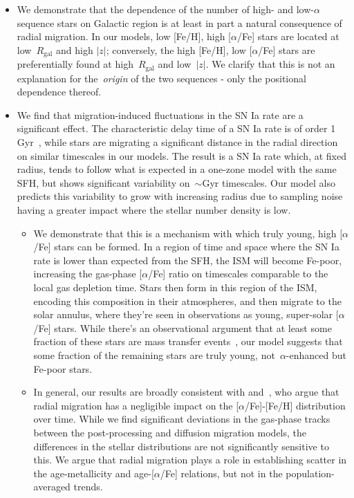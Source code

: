 \documentclass[fleqn, usenatbib]{mnras}
\begin{document}
\begin{itemize}
	\item We demonstrate that the dependence of the number of high- and 
	low-$\alpha$ sequence stars on Galactic region is at least in part a 
	natural consequence of radial migration. In our models, low [Fe/H], high 
	[$\alpha$/Fe] stars are located at low~$R_\text{gal}$ and high 
	$\left|z\right|$; conversely, the high [Fe/H], low [$\alpha$/Fe] stars are 
	preferentially found at high~$R_\text{gal}$ and low~$\left|z\right|$. We 
	clarify that this is not an explanation for the~\textit{origin} of the 
	two sequences - only the positional dependence thereof. 

	\item We find that migration-induced fluctuations in the SN Ia rate are a 
	significant effect. The characteristic delay time of a SN Ia rate is of 
	order 1 Gyr~\citep{Maoz2012, Maoz2017}, while stars are migrating a 
	significant distance in the radial direction on similar timescales in our 
	models. The result is a SN Ia rate which, at fixed radius, tends to follow 
	what is expected in a one-zone model with the same SFH, but shows 
	significant variability on~$\sim$Gyr timescales. Our model also predicts 
	this variability to grow with increasing radius due to sampling noise 
	having a greater impact where the stellar number density is low. 
	\begin{itemize} 
		\item We demonstrate that this is a mechanism with which truly young, 
		high [$\alpha$/Fe] stars can be formed. In a region of time and space 
		where the SN Ia rate is lower than expected from the SFH, the ISM will 
		become Fe-poor, increasing the gas-phase [$\alpha$/Fe] ratio on 
		timescales comparable to the local gas depletion time. Stars 
		then form in this region of the ISM, encoding this composition in their 
		atmospheres, and then migrate to the solar annulus, where they're seen 
		in observations as young, super-solar [$\alpha$/Fe] stars. While 
		there's an observational argument that at least some fraction of these 
		stars are mass transfer events~\citep[e.g.][]{SilvaAguirre2018, 
		Hekker2019}, our model suggests that some fraction of the remaining 
		stars are truly young, not~$\alpha$-enhanced but Fe-poor stars. 

		\item In general, our results are broadly consistent with 
		\citet{Kubryk2013} and~\citet{Khoperskov2021}, who argue that radial 
		migration has a negligible impact on the [$\alpha$/Fe]-[Fe/H] 
		distribution over time. While we find significant deviations in the 
		gas-phase tracks between the post-processing and diffusion migration 
		models, the differences in the stellar distributions are not 
		significantly sensitive to this. We argue that radial migration plays a 
		role in establishing scatter in the age-metallicity and 
		age-[$\alpha$/Fe] relations, but not in the population-averaged 
		trends. 
	\end{itemize} 


\end{itemize}
\end{document}
